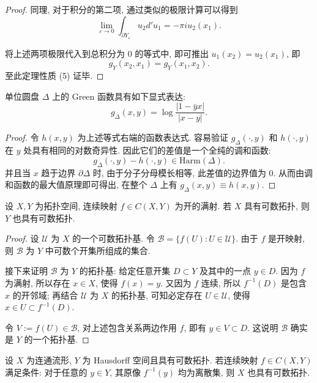 \begin{proof}
同理, 对于积分的第二项, 通过类似的极限计算可以得到
\[ \lim_{\varepsilon \to 0} \int_{\partial Y_\varepsilon} u_2 d'u_1 = -\pi i u_2(x_1). \]

将上述两项极限代入到总积分为 $0$ 的等式中, 即可推出 $u_1(x_2) = u_2(x_1)$, 即
\[ g_Y(x_2, x_1) = g_Y(x_1, x_2). \]
至此定理性质 (5) 证毕.
\end{proof}

\begin{example}
单位圆盘 $\Delta$ 上的 Green 函数具有如下显式表达:
\[ g_\Delta(x, y) = \log\frac{|1-\bar{y}x|}{|x-y|}. \]
\end{example}

\begin{proof}
令 $h(x,y)$ 为上述等式右端的函数表达式. 容易验证 $g_\Delta(\cdot, y)$ 和 $h(\cdot, y)$ 在 $y$ 处具有相同的对数奇异性. 因此它们的差值是一个全纯的调和函数:
\[ g_\Delta(\cdot, y) - h(\cdot, y) \in \mathrm{Harm}(\Delta). \]
并且当 $x$ 趋于边界 $\partial \Delta$ 时, 由于分子分母模长相等, 此差值的边界值为 $0$. 从而由调和函数的最大值原理即可得出, 在整个 $\Delta$ 上有 $g_\Delta(x,y) \equiv h(x,y)$.
\end{proof}

\begin{lemma}\label{3.2.4}
设 $X, Y$ 为拓扑空间, 连续映射 $f \in C(X, Y)$ 为开的满射. 若 $X$ 具有可数拓扑, 则 $Y$ 也具有可数拓扑.
\end{lemma}

\begin{proof}
设 $\mathcal{U}$ 为 $X$ 的一个可数拓扑基. 令 $\mathcal{B} = \{f(U) : U \in \mathcal{U}\}$. 由于 $f$ 是开映射, 则 $\mathcal{B}$ 为 $Y$ 中可数个开集所组成的集合.

接下来证明 $\mathcal{B}$ 为 $Y$ 的拓扑基: 给定任意开集 $D \subset Y$ 及其中的一点 $y \in D$. 因为 $f$ 为满射, 所以存在 $x \in X$, 使得 $f(x) = y$. 
又因为 $f$ 连续, 所以 $f^{-1}(D)$ 是包含 $x$ 的开邻域; 再结合 $\mathcal{U}$ 为 $X$ 的拓扑基, 可知必定存在 $U \in \mathcal{U}$, 使得 $x \in U \subset f^{-1}(D)$.

令 $V := f(U) \in \mathcal{B}$, 对上述包含关系两边作用 $f$, 即有 $y \in V \subset D$. 这说明 $\mathcal{B}$ 确实是 $Y$ 的一个拓扑基.
\end{proof}


\begin{lemma}
设 $X$ 为连通流形, $Y$ 为 Hausdorff 空间且具有可数拓扑. 若连续映射 $f \in C(X, Y)$ 满足条件: 对于任意的 $y \in Y$, 其原像 $f^{-1}(y)$ 均为离散集, 则 $X$ 也具有可数拓扑.
\end{lemma}

